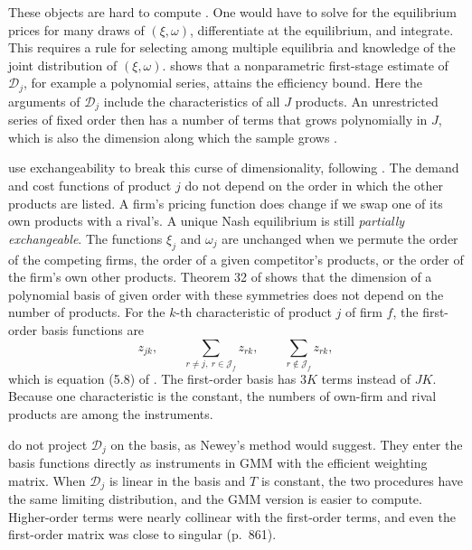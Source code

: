 These objects are hard to compute \citep[p.~860]{BerryLevinsohnPakes1995}. One would have to solve for the
equilibrium prices for many draws of $(\xi, \omega)$, differentiate at the equilibrium, and integrate. This
requires a rule for selecting among multiple equilibria and knowledge of the joint distribution of $(\xi,
\omega)$. \citet{Newey1990} shows that a nonparametric first-stage estimate of $\mathcal{D}_j$, for example a
polynomial series, attains the efficiency bound. Here the arguments of $\mathcal{D}_j$ include the
characteristics of all $J$ products. An unrestricted series of fixed order then has a number of terms that
grows polynomially in $J$, which is also the dimension along which the sample grows
\citep[p.~860]{BerryLevinsohnPakes1995}.

\citet[pp.~860--861]{BerryLevinsohnPakes1995} use exchangeability to break this curse of dimensionality,
following \citet{Pakes1994}. The demand and cost functions of product $j$ do not depend on the order in which
the other products are listed. A firm's pricing function does change if we swap one of its own products with a
rival's. A unique Nash equilibrium is still \emph{partially exchangeable}. The functions $\xi_j$ and $\omega_j$
are unchanged when we permute the order of the competing firms, the order of a given competitor's products, or
the order of the firm's own other products. Theorem 32 of \citet{Pakes1994} shows that the dimension of a
polynomial basis of given order with these symmetries does not depend on the number of products. For the
$k$-th characteristic of product $j$ of firm $f$, the first-order basis functions are
\begin{equation}\label{eq:08-blp-iv}
  z_{jk}, \qquad \sum_{r \neq j,\ r \in \mathcal{J}_f} z_{rk}, \qquad \sum_{r \notin \mathcal{J}_f} z_{rk},
\end{equation}
which is equation (5.8) of \citet{BerryLevinsohnPakes1995}. The first-order basis has $3K$ terms instead of
$JK$. Because one characteristic is the constant, the numbers of own-firm and rival products are among the
instruments.

\citet[p.~862]{BerryLevinsohnPakes1995} do not project $\mathcal{D}_j$ on the basis, as Newey's method would
suggest. They enter the basis functions directly as instruments in GMM with the efficient weighting matrix.
When $\mathcal{D}_j$ is linear in the basis and $T$ is constant, the two procedures have the same limiting
distribution, and the GMM version is easier to compute. Higher-order terms were nearly collinear with the
first-order terms, and even the first-order matrix was close to singular (p.~861).

